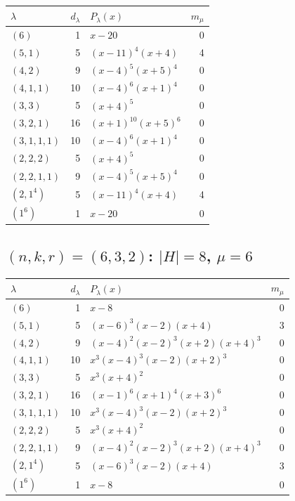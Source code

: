 \documentclass[11pt]{article}
\theoremstyle{definition}
\begin{document}
\begin{center}
\small
\begin{tabularx}{\textwidth}{@{}l r Y r@{}}
\toprule
$\lambda$ & $d_\lambda$ & $P_\lambda(x)$ & $m_\mu$\\
\midrule
$(6)$ & 1 & $x-20$ & 0\\
$(5,1)$ & 5 & $(x-11)^4(x+4)$ & 4\\
$(4,2)$ & 9 & $(x-4)^5(x+5)^4$ & 0\\
$(4,1,1)$ & 10 & $(x-4)^6(x+1)^4$ & 0\\
$(3,3)$ & 5 & $(x+4)^5$ & 0\\
$(3,2,1)$ & 16 & $(x+1)^{10}(x+5)^6$ & 0\\
$(3,1,1,1)$ & 10 & $(x-4)^6(x+1)^4$ & 0\\
$(2,2,2)$ & 5 & $(x+4)^5$ & 0\\
$(2,2,1,1)$ & 9 & $(x-4)^5(x+5)^4$ & 0\\
$(2,1^4)$ & 5 & $(x-11)^4(x+4)$ & 4\\
$(1^6)$ & 1 & $x-20$ & 0\\
\bottomrule
\end{tabularx}
\end{center}

\subsection*{$(n,k,r)=(6,3,2)$: $|H|=8$, $\mu=6$}

\begin{center}
\small
\begin{tabularx}{\textwidth}{@{}l r Y r@{}}
\toprule
$\lambda$ & $d_\lambda$ & $P_\lambda(x)$ & $m_\mu$\\
\midrule
$(6)$ & 1 & $x-8$ & 0\\
$(5,1)$ & 5 & $(x-6)^3(x-2)(x+4)$ & 3\\
$(4,2)$ & 9 & $(x-4)^2(x-2)^3(x+2)(x+4)^3$ & 0\\
$(4,1,1)$ & 10 & $x^3(x-4)^3(x-2)(x+2)^3$ & 0\\
$(3,3)$ & 5 & $x^3(x+4)^2$ & 0\\
$(3,2,1)$ & 16 & $(x-1)^6(x+1)^4(x+3)^6$ & 0\\
$(3,1,1,1)$ & 10 & $x^3(x-4)^3(x-2)(x+2)^3$ & 0\\
$(2,2,2)$ & 5 & $x^3(x+4)^2$ & 0\\
$(2,2,1,1)$ & 9 & $(x-4)^2(x-2)^3(x+2)(x+4)^3$ & 0\\
$(2,1^4)$ & 5 & $(x-6)^3(x-2)(x+4)$ & 3\\
$(1^6)$ & 1 & $x-8$ & 0\\
\bottomrule
\end{tabularx}
\end{center}



\end{document}
